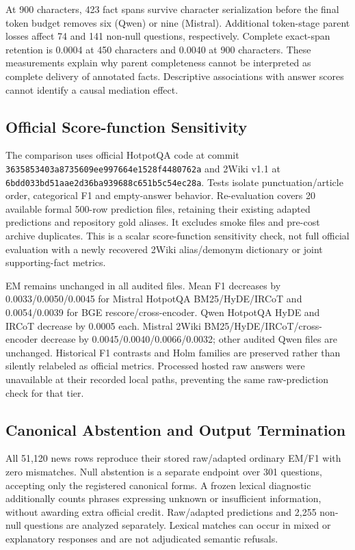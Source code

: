 At 900 characters, 423 fact spans survive character serialization before the final token budget removes six (Qwen) or nine (Mistral). Additional token-stage parent losses affect 74 and 141 non-null questions, respectively. Complete exact-span retention is 0.0004 at 450 characters and 0.0040 at 900 characters. These measurements explain why parent completeness cannot be interpreted as complete delivery of annotated facts. Descriptive associations with answer scores cannot identify a causal mediation effect.

\FloatBarrier
\subsection{Official Score-function Sensitivity}
The comparison uses official HotpotQA code at commit \texttt{3635853403a8735609ee997664e1528f4480762a} and 2Wiki v1.1 at \texttt{6bdd033bd51aae2d36ba939688c651b5c54ec28a}. Tests isolate punctuation/article order, categorical F1 and empty-answer behavior. Re-evaluation covers 20 available formal 500-row prediction files, retaining their existing adapted predictions and repository gold aliases. It excludes smoke files and pre-cost archive duplicates. This is a scalar score-function sensitivity check, not full official evaluation with a newly recovered 2Wiki alias/demonym dictionary or joint supporting-fact metrics.

EM remains unchanged in all audited files. Mean F1 decreases by 0.0033/0.0050/0.0045 for Mistral HotpotQA BM25/HyDE/IRCoT and 0.0054/0.0039 for BGE rescore/cross-encoder. Qwen HotpotQA HyDE and IRCoT decrease by 0.0005 each. Mistral 2Wiki BM25/HyDE/IRCoT/cross-encoder decrease by 0.0045/0.0040/0.0066/0.0032; other audited Qwen files are unchanged. Historical F1 contrasts and Holm families are preserved rather than silently relabeled as official metrics. Processed hosted raw answers were unavailable at their recorded local paths, preventing the same raw-prediction check for that tier.

\subsection{Canonical Abstention and Output Termination}
All 51,120 news rows reproduce their stored raw/adapted ordinary EM/F1 with zero mismatches. Null abstention is a separate endpoint over 301 questions, accepting only the registered canonical forms. A frozen lexical diagnostic additionally counts phrases expressing unknown or insufficient information, without awarding extra official credit. Raw/adapted predictions and 2,255 non-null questions are analyzed separately. Lexical matches can occur in mixed or explanatory responses and are not adjudicated semantic refusals.

